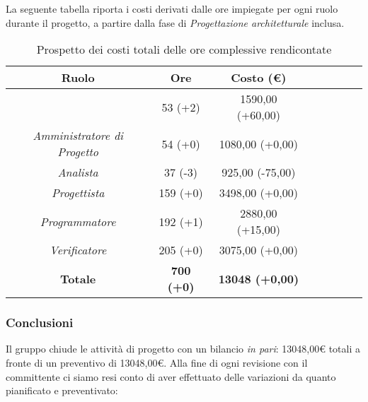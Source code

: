 La seguente tabella riporta i costi derivati dalle ore impiegate per ogni ruolo durante il progetto, a partire dalla fase di \textit{Progettazione architetturale} inclusa.

\begin{table}[H]
		\begin{center}
			\setlength{\aboverulesep}{0pt}
			\setlength{\belowrulesep}{0pt}
			\setlength{\extrarowheight}{.75ex}
			\begin{tabular}{ c c c c c c c c }
				\rowcolor{AzzurroGruppo!30} 
				\textbf{Ruolo} & \textbf{Ore} & \textbf{Costo (\euro{})}\\
				\toprule
				\RdP{}   & 53 (+2) & 1590,00 (+60,00)\\
				\textit{Amministratore di Progetto} & 54 (+0) & 1080,00 (+0,00) \\
				\textit{Analista}       & 37 (-3) & 925,00 (-75,00) \\
				\textit{Progettista}    & 159 (+0) & 3498,00 (+0,00) \\
				\textit{Programmatore}  & 192 (+1) & 2880,00 (+15,00) \\
				\textit{Verificatore}   & 205 (+0) & 3075,00 (+0,00)\\
				\textbf{Totale} & \textbf{700 (+0)} & \textbf{13048 (+0,00)} \\
				\bottomrule
			\end{tabular}
			\caption{Prospetto dei costi totali delle ore complessive rendicontate}
		\end{center}
	\end{table}
	
\subsubsection{Conclusioni}
Il gruppo chiude le attività di progetto con un bilancio \textit{in pari}: 13048,00\euro{} totali a fronte di un preventivo di 13048,00\euro{}.\newline{}
Alla fine di ogni revisione con il committente ci siamo resi conto di aver effettuato delle variazioni da quanto pianificato e preventivato:


